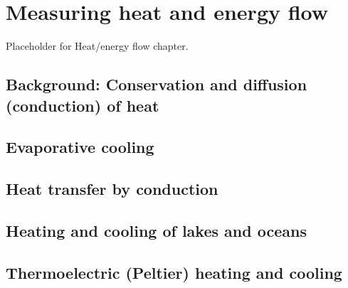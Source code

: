 \setchapterpreamble[u]{\margintoc}
\chapter{\color{gray} Measuring heat and energy flow \color{black}}

Placeholder for Heat/energy flow chapter.

\section{\color{gray} Background: Conservation and diffusion (conduction) of heat \color{black}}
\section{\color{gray} Evaporative cooling \color{black}}
\section{\color{gray} Heat transfer by conduction \color{black}}
\section{\color{gray} Heating and cooling of lakes and oceans \color{black}}
\section{\color{gray} Thermoelectric (Peltier) heating and cooling \color{black}}
